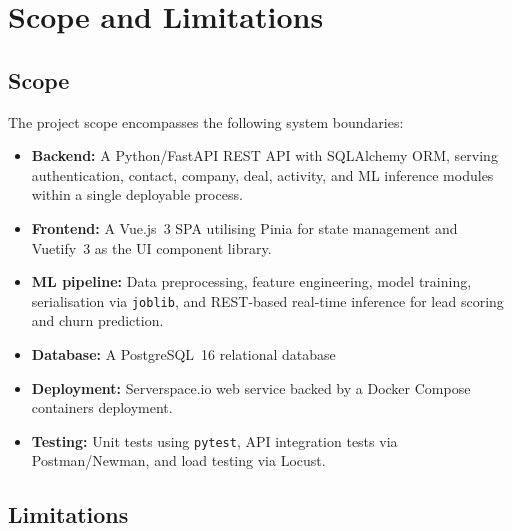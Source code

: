 \section{Scope and Limitations}

\subsection{Scope}

The project scope encompasses the following system boundaries:

\begin{itemize}
  \item \textbf{Backend:} A Python/FastAPI REST API with SQLAlchemy ORM,
  serving authentication, contact, company, deal, activity, and ML
  inference modules within a single deployable process.
  \item \textbf{Frontend:} A Vue.js~3 SPA utilising Pinia for state
  management and Vuetify~3 as the UI component library.
  \item \textbf{ML pipeline:} Data preprocessing, feature engineering,
  model training, serialisation via \texttt{joblib}, and REST-based
  real-time inference for lead scoring and churn prediction.
  \item \textbf{Database:} A PostgreSQL~16 relational database 
  \item \textbf{Deployment:} Serverspace.io web service backed by a
  Docker Compose containers deployment. 
  \item \textbf{Testing:} Unit tests using \texttt{pytest}, API integration
  tests via Postman/Newman, and load testing via Locust.
\end{itemize}

\subsection{Limitations}

